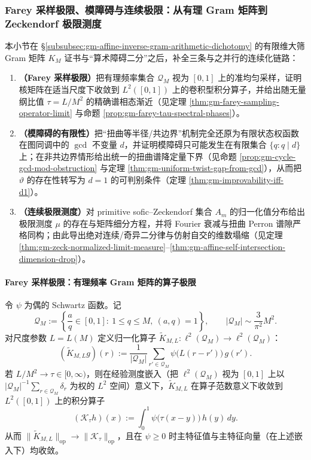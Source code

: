 \subsubsection{Farey 采样极限、模障碍与连续极限：从有理 Gram 矩阵到 Zeckendorf 极限测度}\label{subsubsec:gm-farey-limit-mod-obstruction-zeck-measure}
本小节在 \S\ref{subsubsec:gm-affine-inverse-gram-arithmetic-dichotomy} 的有限维大筛 Gram 矩阵 \(K_M\) 证书与“算术障碍二分”之后，补全三条与之并行的连续化链路：
\begin{enumerate}
  \item \textbf{（Farey 采样极限）}把有理频率集合 \(\mathcal{Q}_M\) 视为 \([0,1]\) 上的准均匀采样，证明核矩阵在适当尺度下收敛到 \(L^2([0,1])\) 上的卷积型积分算子，并给出随无量纲比值 \(\tau=L/M^2\) 的精确谱相态渐近（见定理 \ref{thm:gm-farey-sampling-operator-limit} 与命题 \ref{prop:gm-farey-tau-spectral-phases}）。
  \item \textbf{（模障碍的有限性）}把“扭曲等半径/共边界”机制完全还原为有限状态权函数在图同调中的 \(\gcd\) 不变量 \(d\)，并证明模障碍只可能发生在有限集合 \(\{q:q\mid d\}\) 上；在非共边界情形给出统一的扭曲谱降定量下界（见命题 \ref{prop:gm-cycle-gcd-mod-obstruction} 与定理 \ref{thm:gm-uniform-twist-gap-from-gcd}），从而把 \(\vartheta\) 的存在性转写为 \(d=1\) 的可判别条件（定理 \ref{thm:gm-improvability-iff-d1}）。
  \item \textbf{（连续极限测度）}对 primitive sofic--Zeckendorf 集合 \(A_m\) 的归一化值分布给出极限测度 \(\mu\) 的存在与矩阵细分方程，并将 Fourier 衰减与扭曲 Perron 谱隙严格同构；由此导出绝对连续/奇异二分律与仿射自交的维数塌缩（见定理 \ref{thm:gm-zeck-normalized-limit-measure}--\ref{thm:gm-affine-self-intersection-dimension-drop}）。
\end{enumerate}

\paragraph{Farey 采样极限：有理频率 Gram 矩阵的算子极限}
\begin{theorem}\label{thm:gm-farey-sampling-operator-limit}
令 \(\psi\) 为偶的 Schwartz 函数。记
\[
\mathcal{Q}_M:=\left\{\frac{a}{q}\in[0,1]:\ 1\le q\le M,\ (a,q)=1\right\},
\qquad
|\mathcal{Q}_M|\sim \frac{3}{\pi^2}M^2.
\]
对尺度参数 \(L=L(M)\) 定义归一化算子 \(\widetilde K_{M,L}:\ell^2(\mathcal{Q}_M)\to \ell^2(\mathcal{Q}_M)\)：
\[
(\widetilde K_{M,L}g)(r)
:=\frac{1}{|\mathcal{Q}_M|}\sum_{r'\in\mathcal{Q}_M}\psi\!\bigl(L(r-r')\bigr)\,g(r').
\]
若 \(L/M^2\to\tau\in[0,\infty)\)，则在经验测度嵌入（把 \(\ell^2(\mathcal{Q}_M)\) 视为 \([0,1]\) 上以 \(|\mathcal{Q}_M|^{-1}\sum_{r\in\mathcal{Q}_M}\delta_r\) 为权的 \(L^2\) 空间）意义下，\(\widetilde K_{M,L}\) 在算子范数意义下收敛到 \(L^2([0,1])\) 上的积分算子
\[
(\mathcal{K}_\tau h)(x):=\int_0^1 \psi\!\bigl(\tau(x-y)\bigr)\,h(y)\,dy.
\]
从而 \(\|\widetilde K_{M,L}\|_{\mathrm{op}}\to \|\mathcal{K}_\tau\|_{\mathrm{op}}\)，且在 \(\psi\ge 0\) 时主特征值与主特征向量（在上述嵌入下）均收敛。
\end{theorem}

